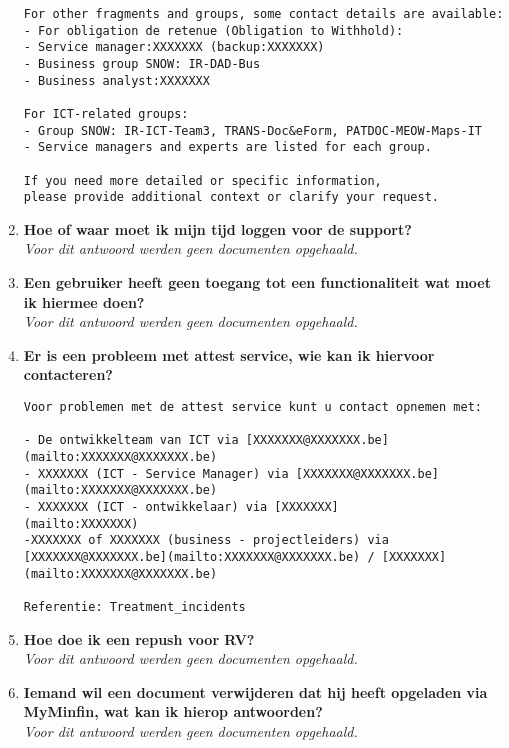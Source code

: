 \begin{enumerate}
\begin{verbatim}
For other fragments and groups, some contact details are available:
- For obligation de retenue (Obligation to Withhold):
- Service manager:XXXXXXX (backup:XXXXXXX)
- Business group SNOW: IR-DAD-Bus
- Business analyst:XXXXXXX

For ICT-related groups:
- Group SNOW: IR-ICT-Team3, TRANS-Doc&eForm, PATDOC-MEOW-Maps-IT
- Service managers and experts are listed for each group.

If you need more detailed or specific information, 
please provide additional context or clarify your request.
    \end{verbatim}
    
    \item \textbf{Hoe of waar moet ik mijn tijd loggen voor de support?} \\
    \textit{Voor dit antwoord werden geen documenten opgehaald.}
    
    \item \textbf{Een gebruiker heeft geen toegang tot een functionaliteit wat moet ik hiermee doen?} \\
    \textit{Voor dit antwoord werden geen documenten opgehaald.}
   
    \item \textbf{Er is een probleem met attest service, wie kan ik hiervoor contacteren?} \\
    \begin{verbatim}
Voor problemen met de attest service kunt u contact opnemen met:

- De ontwikkelteam van ICT via [XXXXXXX@XXXXXXX.be]
(mailto:XXXXXXX@XXXXXXX.be)
- XXXXXXX (ICT - Service Manager) via [XXXXXXX@XXXXXXX.be]
(mailto:XXXXXXX@XXXXXXX.be)
- XXXXXXX (ICT - ontwikkelaar) via [XXXXXXX]
(mailto:XXXXXXX)
-XXXXXXX of XXXXXXX (business - projectleiders) via 
[XXXXXXX@XXXXXXX.be](mailto:XXXXXXX@XXXXXXX.be) / [XXXXXXX]
(mailto:XXXXXXX@XXXXXXX.be)

Referentie: Treatment_incidents
    \end{verbatim}
    
    \item \textbf{Hoe doe ik een repush voor RV?} \\
    \textit{Voor dit antwoord werden geen documenten opgehaald.}
    
    \item \textbf{Iemand wil een document verwijderen dat hij heeft opgeladen via MyMinfin, wat kan ik hierop antwoorden?} \\
    \textit{Voor dit antwoord werden geen documenten opgehaald.}
    

\end{enumerate}
